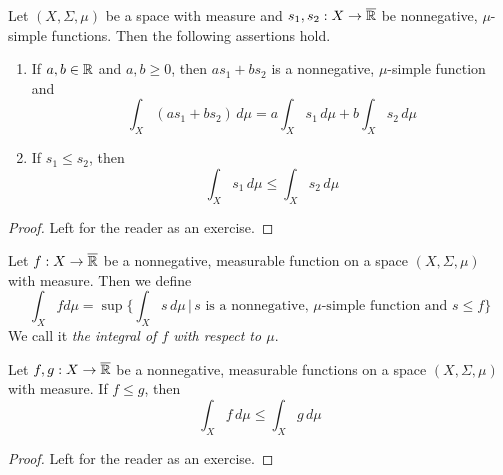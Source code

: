 \begin{fact}\label{fact:basics_for_simple_functions}
    Let $(X,\Sigma,\mu)$ be a space with measure and $s_1, s_2:X\rightarrow \overline{{\mathbb R}}$ be nonnegative, $\mu$-simple functions. Then the following assertions hold.
    \begin{enumerate}[label=\emph{\textbf{(\arabic*)}}, leftmargin=*]
        \item If $a, b\in {\mathbb R}$ and $a, b\geq 0$, then $a s_1 + b s_2$ is a nonnegative, $\mu$-simple function and
              $$\int_X\left(a s_1 + b s_2\right)\,d\mu = a \int_Xs_1\,d\mu + b \int_Xs_2\,d\mu$$
        \item If $s_1\leq s_2$, then
              $$\int_Xs_1\,d\mu \leq \int_Xs_2\,d\mu$$
    \end{enumerate}
\end{fact}
\begin{proof}
    Left for the reader as an exercise.
\end{proof}

\begin{definition}
    Let $f:X\rightarrow \overline{{\mathbb R}}$ be a nonnegative, measurable function on a space $(X,\Sigma,\mu)$ with measure. Then we define
    $$\int_X f d\mu = \sup\bigg\{\int_X s\, d\mu\,\bigg|\,s\mbox{ is a nonnegative, }\mu\mbox{-simple function and }s\leq f\bigg\}$$
    We call it \textit{the integral of $f$ with respect to $\mu$}.
\end{definition}

\begin{fact}\label{fact:integral_is_monotone}
    Let $f,g:X\rightarrow \overline{{\mathbb R}}$ be a nonnegative, measurable functions on a space $(X,\Sigma,\mu)$ with measure. If $f\leq g$, then
    $$\int_Xf\,d\mu \leq \int_Xg\,d\mu$$
\end{fact}
\begin{proof}
    Left for the reader as an exercise.
\end{proof}

